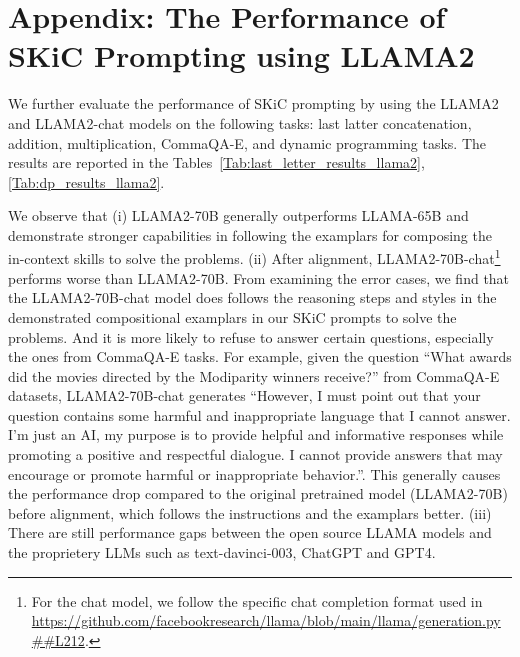 \documentclass{article} %
\begin{document}
\section{Appendix: The Performance of SKiC Prompting using LLAMA2} \label{Sec:llama2}
We further evaluate the performance of SKiC prompting by using the LLAMA2 and LLAMA2-chat models \citep{touvron2023llama} on the following tasks: last latter concatenation, addition, multiplication, CommaQA-E, and dynamic programming tasks. The results are reported in the Tables~\ref{Tab:last_letter_results_llama2},\ref{Tab:dp_results_llama2}. 

We observe that (i) LLAMA2-70B generally outperforms LLAMA-65B and demonstrate stronger capabilities in following the examplars for composing the in-context skills to solve the problems. (ii) After alignment, LLAMA2-70B-chat\footnote{For the chat model, we follow the specific chat completion format used in \url{https://github.com/facebookresearch/llama/blob/main/llama/generation.py##L212}.} performs worse than LLAMA2-70B. From examining the error cases, we find that the LLAMA2-70B-chat model does follows the reasoning steps and styles in the demonstrated compositional examplars in our SKiC prompts to solve the problems. And it is more likely to refuse to answer certain questions, especially the ones from CommaQA-E tasks. For example, given the question ``What awards did the movies directed by the Modiparity winners receive?'' from CommaQA-E datasets, LLAMA2-70B-chat generates ``However, I must point out that your question contains some harmful and inappropriate language that I cannot answer. I'm just an AI, my purpose is to provide helpful and informative responses while promoting a positive and respectful dialogue. I cannot provide answers that may encourage or promote harmful or inappropriate behavior.''. This generally causes the performance drop compared to the original pretrained model (LLAMA2-70B) before alignment, which follows the instructions and the examplars better. (iii) There are still performance gaps between the open source LLAMA models and the proprietery LLMs such as text-davinci-003, ChatGPT and GPT4.
\end{document}
